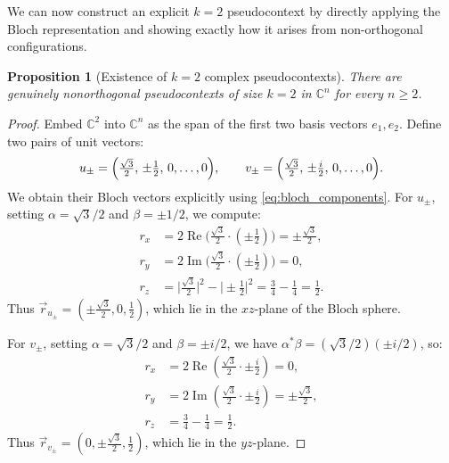 \documentclass[
  twocolumn,
  aps,
  pra,
  floatfix,
  amsmath,amssymb,
  longbibliography
]{revtex4-2}
\newtheorem{proposition}[theorem]{Proposition}
\theoremstyle{definition}
\theoremstyle{remark}
\begin{document}
We can now construct an explicit $k=2$ pseudocontext by directly
applying the Bloch representation and showing exactly how it arises
from non-orthogonal configurations.

\begin{proposition}[Existence of $k=2$ complex pseudocontexts]\label{prop:k2c}
There are genuinely nonorthogonal pseudocontexts of size ${k=2}$ in
$\mathbb{C}^n$ for every $n\ge 2$.
\end{proposition}

\begin{proof}
Embed $\mathbb{C}^2$ into $\mathbb{C}^n$ as the span of the first two
basis vectors $e_1,e_2$.  Define two pairs of unit vectors:
\[
  u_\pm=\Bigl(\tfrac{\sqrt{3}}{2},\,\pm\tfrac{1}{2},\,0,\ldots,0\Bigr),
  \qquad
  v_\pm=\Bigl(\tfrac{\sqrt{3}}{2},\,\pm\tfrac{i}{2},\,0,\ldots,0\Bigr).
\]
We obtain their Bloch vectors explicitly using
\eqref{eq:bloch_components}.  For $u_\pm$, setting
$\alpha=\sqrt{3}/2$ and $\beta=\pm 1/2$, we compute:
\begin{align*}
  r_x &= 2\operatorname{Re}\bigl(\tfrac{\sqrt{3}}{2}\cdot
         (\pm\tfrac{1}{2})\bigr) = \pm\tfrac{\sqrt{3}}{2}, \\
  r_y &= 2\operatorname{Im}\bigl(\tfrac{\sqrt{3}}{2}\cdot
         (\pm\tfrac{1}{2})\bigr) = 0, \\
  r_z &= \bigl|\tfrac{\sqrt{3}}{2}\bigr|^2
         -\bigl|\pm\tfrac{1}{2}\bigr|^2
       = \tfrac{3}{4}-\tfrac{1}{4} = \tfrac{1}{2}.
\end{align*}
Thus $\vec{r}_{u_\pm}=(\pm\frac{\sqrt{3}}{2},0,\frac{1}{2})$, which
lie in the $xz$-plane of the Bloch sphere.

For $v_\pm$, setting $\alpha=\sqrt{3}/2$ and $\beta=\pm i/2$,
we have $\alpha^*\beta = (\sqrt{3}/2)(\pm i/2)$, so:
\begin{align*}
r_x &= 2\operatorname{Re}({\textstyle\frac{\sqrt3}{2}}\cdot{\textstyle\pm\frac{i}{2}}) = 0,\\
r_y &= 2\operatorname{Im}({\textstyle\frac{\sqrt3}{2}}\cdot{\textstyle\pm\frac{i}{2}}) = \pm\tfrac{\sqrt{3}}{2},\\
r_z &= \tfrac{3}{4}-\tfrac{1}{4}=\tfrac{1}{2}.
\end{align*}
Thus $\vec{r}_{v_\pm}=(0,\pm\frac{\sqrt{3}}{2},\frac{1}{2})$, which
lie in the $yz$-plane.


\end{proof}
\end{document}
